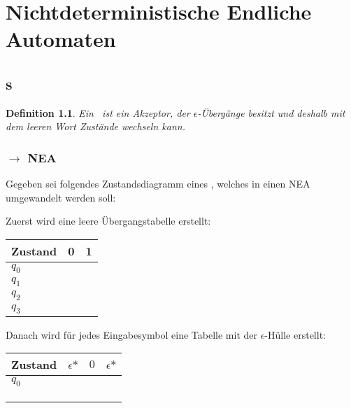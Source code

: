 \documentclass[12pt, oneside]{book}
\newtheorem{definition}{Definition}
\begin{document}
\chapter{Nichtdeterministische Endliche Automaten}
\section[Epsilon-NEAs]{\enea s}
\begin{definition}
    Ein \enea\ ist ein Akzeptor, der $\epsilon$-Übergänge besitzt und deshalb mit dem leeren Wort Zustände wechseln kann.
\end{definition}
\subsection[Epsilon-NEA zu NEA]{\enea $\to$ NEA}
Gegeben sei folgendes Zustandsdiagramm eines \enea, welches in einen NEA umgewandelt werden soll:
\begin{figure}[H]
    \centering
    \begin{transitiongraph}[fa]
    \end{transitiongraph}
\end{figure}
Zuerst wird eine leere Übergangstabelle erstellt:
\begin{table}[H]
    \centering
    \begin{tabular}{|l|l|l|}
    \hline
    Zustand & 0 & 1 \\ \hline
    $q_0$   &   &   \\ \hline
    $q_1$   &   &   \\ \hline
    $q_2$   &   &   \\ \hline
    $q_3$   &   &   \\ \hline
    \end{tabular}
\end{table}
Danach wird für jedes Eingabesymbol eine Tabelle mit der $\epsilon$-Hülle erstellt:
\begin{table}[H]
    \centering
    \begin{tabular}{|l|l|l|l|}
    \hline
    Zustand & $\epsilon\mbox{*}$ & $0$   & $\epsilon\mbox{*}$ \\ \hline
    $q_0$   &                    &       &                    \\ \hline
            &                    &       &                    \\ \hline
            &                    &       &                    \\ \hline
            &                    &       &                    \\ \hline
    \end{tabular}
\end{table}
\end{document}
